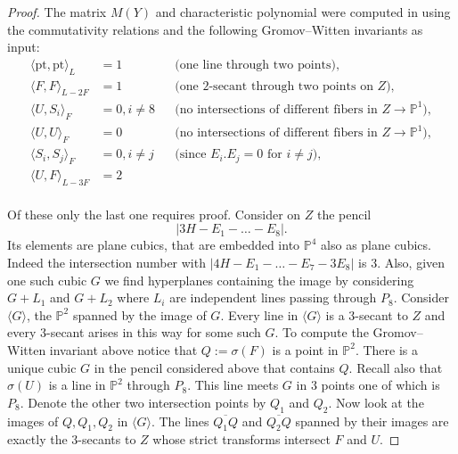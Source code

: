 \documentclass[11pt]{amsart}
\theoremstyle{plain}
\numberwithin{equation}{section}
\theoremstyle{definition}
\theoremstyle{remark}
\renewcommand{\P}{\mathbb P}
\begin{document}
\begin{proof}
The matrix $M(Y)$ and characteristic polynomial were computed in \cite{BvBS26} using the commutativity relations and the following Gromov--Witten invariants as input:
\begin{align*}
    \langle \mathrm{pt},\mathrm{pt} \rangle_{L}
        &= 1
        && \text{(one line through two points)}, \\
    \langle F,F \rangle_{L-2F}
        &= 1
        && \text{(one $2$-secant through two points on $Z$)}, \\
    \langle U,S_i \rangle_{F}
        &= 0, i \not=8
        && \text{(no intersections of different fibers in $Z\to \P^1$)}, \\
    \langle U,U \rangle_{F}
        &= 0
        && \text{(no intersections of different fibers in $Z\to \P^1$)}, \\
    \langle S_i,S_j \rangle_{F}
        &= 0, i\not=j
        && \text{(since $E_i.E_j=0$ for $i\not=j$)}, \\
     \langle U,F\rangle_{L-3F}
        &= 2
        && \\
\end{align*}

\noindent
Of these only the last one requires proof. Consider on $Z$ the pencil
\[
    |3H-E_1-\dots -E_8|.
\]
Its elements are plane cubics, that are embedded into $\P^4$ also as plane cubics. Indeed the intersection number with $|4H -E_1-\dots -E_7 - 3E_8|$ is $3$. Also, given one such cubic $G$ we find hyperplanes containing the image by considering $G+L_1$ and $G+L_2$
where $L_i$ are independent lines passing through $P_8$. Consider $\langle G \rangle$, the $\P^2$ spanned by 
the image of $G$. Every line in $\langle G \rangle$ is a $3$-secant to $Z$ and every $3$-secant arises in this way for some such $G$. To compute the Gromov--Witten invariant above notice that $Q := \sigma(F)$ is a point in $\P^2$. There is a unique cubic $G$ in the pencil considered above that contains $Q$. Recall also that $\sigma(U)$ is a line in $\P^2$ through $P_8$. This line meets $G$ in $3$ points one of which is $P_8$. Denote the other two intersection points by $Q_1$ and $Q_2$. Now look at the images of $Q,Q_1,Q_2$ in $\langle G \rangle$. The lines $\overline{Q_1Q}$ and $\overline{Q_2Q}$ spanned by their images are exactly the $3$-secants to $Z$ whose strict transforms intersect $F$ and $U$. 
\end{proof}
\end{document}
